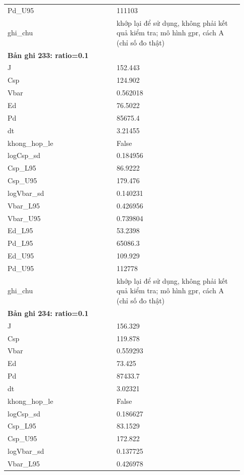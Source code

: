 \begin{longtable}{p{0.43\linewidth}p{0.50\linewidth}}
Pd\_\allowbreak U95 & 111103 \\
ghi\_\allowbreak chu & khớp lại để sử dụng, không phải kết quả kiểm tra; mô hình gpr, cách A (chỉ số đo thật) \\
\midrule
\multicolumn{2}{p{0.95\linewidth}}{\textbf{Bản ghi 233: ratio=0.1}} \\
J & 152.443 \\
Csp & 124.902 \\
Vbar & 0.562018 \\
Ed & 76.5022 \\
Pd & 85675.4 \\
dt & 3.21455 \\
khong\_\allowbreak hop\_\allowbreak le & False \\
logCsp\_\allowbreak sd & 0.184956 \\
Csp\_\allowbreak L95 & 86.9222 \\
Csp\_\allowbreak U95 & 179.476 \\
logVbar\_\allowbreak sd & 0.140231 \\
Vbar\_\allowbreak L95 & 0.426956 \\
Vbar\_\allowbreak U95 & 0.739804 \\
Ed\_\allowbreak L95 & 53.2398 \\
Pd\_\allowbreak L95 & 65086.3 \\
Ed\_\allowbreak U95 & 109.929 \\
Pd\_\allowbreak U95 & 112778 \\
ghi\_\allowbreak chu & khớp lại để sử dụng, không phải kết quả kiểm tra; mô hình gpr, cách A (chỉ số đo thật) \\
\midrule
\multicolumn{2}{p{0.95\linewidth}}{\textbf{Bản ghi 234: ratio=0.1}} \\
J & 156.329 \\
Csp & 119.878 \\
Vbar & 0.559293 \\
Ed & 73.425 \\
Pd & 87433.7 \\
dt & 3.02321 \\
khong\_\allowbreak hop\_\allowbreak le & False \\
logCsp\_\allowbreak sd & 0.186627 \\
Csp\_\allowbreak L95 & 83.1529 \\
Csp\_\allowbreak U95 & 172.822 \\
logVbar\_\allowbreak sd & 0.137725 \\
Vbar\_\allowbreak L95 & 0.426978 \\

\end{longtable}
